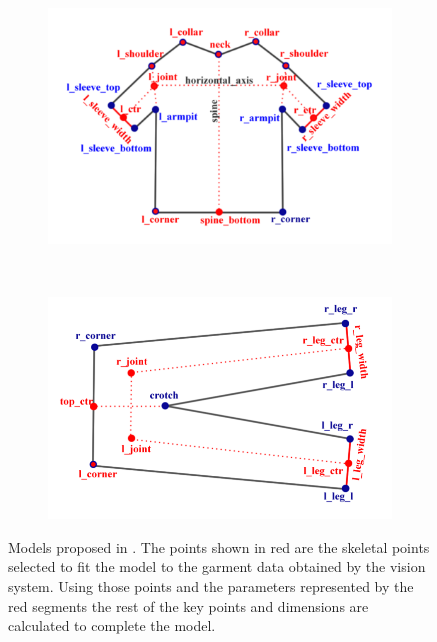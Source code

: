 \begin{figure}[htbp]
	\centering
    \begin{subfigure}[l]{0.49\textwidth}
        \centering
    	\includegraphics[width=\textwidth]
    	{figures/SOTA_Miller_2011.png}
    \end{subfigure}
    ~
    \begin{subfigure}[r]{0.49\textwidth}
	   \centering
		\includegraphics[width=\textwidth]
		{figures/SOTA_Miller_2011-2.png}
	\end{subfigure} 
   	\caption[Models proposed by Miller et al.]{Models proposed in \cite{Miller2011}. The points shown in red are the skeletal points selected to fit the model to the garment data obtained by the vision system. Using those points and the parameters represented by the red segments the rest of the key points and dimensions are calculated to complete the model.}
   	\label{fig:SOTA_Miller_2011}
\end{figure}

